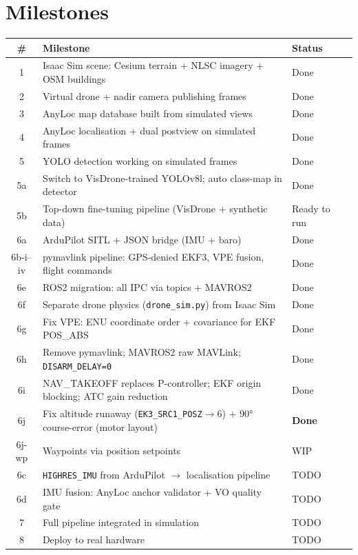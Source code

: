 \documentclass[11pt,a4paper]{article}
\begin{document}
\section{Milestones}
\label{sec:milestones}

\begin{longtable}{@{}clll@{}}
\toprule
\textbf{\#} & \textbf{Milestone} & \textbf{Status}\\
\midrule
\endhead
1 & Isaac Sim scene: Cesium terrain + NLSC imagery + OSM buildings & Done\\
2 & Virtual drone + nadir camera publishing frames & Done\\
3 & AnyLoc map database built from simulated views & Done\\
4 & AnyLoc localisation + dual postview on simulated frames & Done\\
5 & YOLO detection working on simulated frames & Done\\
5a & Switch to VisDrone-trained YOLOv8l; auto class-map in detector & Done\\
5b & Top-down fine-tuning pipeline (VisDrone + synthetic data) & Ready to run\\
6a & ArduPilot SITL + JSON bridge (IMU + baro) & Done\\
6b-i--iv & pymavlink pipeline: GPS-denied EKF3, VPE fusion, flight commands & Done\\
6e & ROS2 migration: all IPC via topics + MAVROS2 & Done\\
6f & Separate drone physics (\texttt{drone\_sim.py}) from Isaac Sim & Done\\
6g & Fix VPE: ENU coordinate order + covariance for EKF POS\_ABS & Done\\
6h & Remove pymavlink; MAVROS2 raw MAVLink; \texttt{DISARM\_DELAY=0} & Done\\
6i & NAV\_TAKEOFF replaces P-controller; EKF origin blocking; ATC gain reduction & Done\\
6j & Fix altitude runaway (\texttt{EK3\_SRC1\_POSZ}$\to$6) + 90° course-error (motor layout) & \textbf{Done}\\
6j-wp & Waypoints via position setpoints & WIP\\
6c & \texttt{HIGHRES\_IMU} from ArduPilot $\to$ localisation pipeline & TODO\\
6d & IMU fusion: AnyLoc anchor validator + VO quality gate & TODO\\
7 & Full pipeline integrated in simulation & TODO\\
8 & Deploy to real hardware & TODO\\
\bottomrule
\end{longtable}
\end{document}
